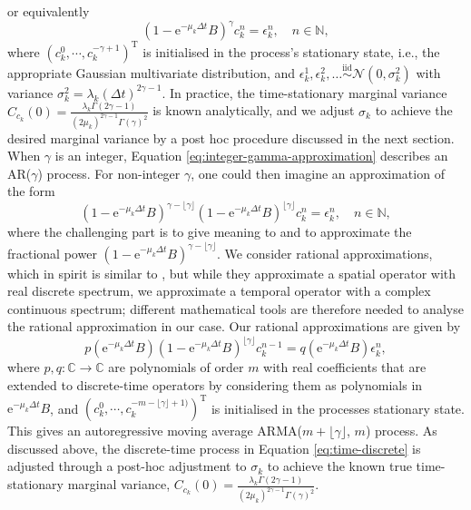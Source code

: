 \documentclass[12pt]{article} %
\begin{document}
or equivalently
\begin{equation}
    \label{eq:integer-gamma-approximation}
    (1-\mathrm{e}^{-\mu_k\Delta t}B)^\gamma c_k^{n} = \epsilon_k^n, \quad n\in\mathbb{N},
\end{equation} 
where $(c_k^0, \cdots, c_k^{-\gamma+1})^\mathrm{T}$ is initialised in the process's stationary state, i.e., the appropriate Gaussian multivariate distribution, and $\epsilon_k^1,\epsilon_k^2,\ldots \overset{\mathrm{iid}}{\sim}\mathcal{N}(0, \sigma_k^2)$ with variance $\sigma_k^2 = \lambda_k (\Delta t)^{2 \gamma - 1}$. 
In practice, the time-stationary marginal variance $C_{c_k}(0)=\frac{\lambda_k \Gamma(2 \gamma - 1)}{(2 \mu_k)^{2 \gamma - 1} \Gamma(\gamma)^2}$ is known analytically, and we adjust $\sigma_k$ to achieve the desired marginal variance by a post hoc procedure discussed in the next section. %
When $\gamma$ is an integer, Equation \eqref{eq:integer-gamma-approximation} describes an AR($\gamma$) process. For non-integer $\gamma$, one could then imagine an approximation of the form
\[
    (1-\mathrm{e}^{-\mu_k\Delta t}B)^{\gamma-\lfloor\gamma\rfloor}(1-\mathrm{e}^{-\mu_k\Delta t}B)^{\lfloor\gamma\rfloor} c_k^{n} = \epsilon_k^n, \quad n\in\mathbb{N},
\]
where the challenging part is to give meaning to and
to approximate the fractional power $(1-\mathrm{e}^{-\mu_k\Delta t}B)^{\gamma-\lfloor\gamma\rfloor}$. We consider rational approximations, which in spirit is similar to \cite{Bolin2019}, but while they approximate a spatial operator with real discrete spectrum, 
we approximate a temporal operator with a complex continuous spectrum; different mathematical tools are therefore needed to analyse the rational approximation in our case. Our rational approximations are given by
\begin{equation}
p(\mathrm{e}^{-\mu_k\Delta t}B)(1-\mathrm{e}^{-\mu_k\Delta t}B)^{\lfloor\gamma\rfloor} c_k^{n-1} = q(\mathrm{e}^{-\mu_k\Delta t}B)\epsilon_k^n,\label{eq:time-discrete}
\end{equation}
where $p,q:\mathbb{C}\rightarrow\mathbb{C}$ are polynomials  of order $m$ with real coefficients that are extended to discrete-time operators by considering them as polynomials in $\mathrm{e}^{-\mu_k\Delta t}B$, and $(c_k^0, \cdots, c_k^{-m-\lfloor \gamma\rfloor+1)})^\mathrm{T}$ is initialised in the processes stationary state. This gives an autoregressive moving average ARMA($m+\lfloor\gamma\rfloor$, $m$) process. As discussed above, the discrete-time process in Equation \eqref{eq:time-discrete} is adjusted through a post-hoc adjustment to 
$\sigma_k$ to achieve the known true time-stationary marginal variance, $C_{c_k}(0)=\frac{\lambda_k \Gamma(2 \gamma - 1)}{(2 \mu_k)^{2 \gamma - 1} \Gamma(\gamma)^2}$.
\end{document}
